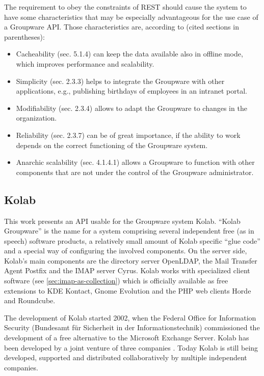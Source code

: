 \documentclass[11pt,a4paper,headsepline,twoside]{scrartcl}		%
\begin{document}
The requirement to obey the constraints of REST should cause the system to have
some characteristics that may be especially advantageous for the use case of a
Groupware API. Those characteristics are, according to \cite{Fielding2000}
(cited sections in parentheses):

\begin{itemize}
\item Cacheability (sec. 5.1.4) can keep the data available also in offline
  mode, which improves performance and scalability.
\item Simplicity (sec. 2.3.3) helps to integrate the Groupware with other
  applications, e.g., publishing birthdays of employees in an intranet portal.
\item Modifiability (sec. 2.3.4) allows to adapt the Groupware to changes in the
  organization.
\item Reliability (sec. 2.3.7) can be of great importance, if the ability to
  work depends on the correct functioning of the Groupware system.
\item Anarchic scalability (sec. 4.1.4.1) allows a Groupware to function with
  other components that are not under the control of the Groupware
  administrator.
\end{itemize}


\subsection{Kolab}
\label{sec:kolab}

This work presents an API usable for the Groupware system Kolab. ``Kolab
Groupware'' is the name for a system comprising several independent free (as in
speech) software products, a relatively small amount of Kolab specific ``glue
code'' and a special way of configuring the involved components. On the server
side, Kolab's main components are the directory server OpenLDAP, the Mail
Transfer Agent Postfix and the IMAP server Cyrus. Kolab works with specialized
client software (see \autoref{sec:imap-as-collection}) which is officially
available as free extensions to KDE Kontact, Gnome Evolution and the PHP web
clients Horde and Roundcube.

The development of Kolab started 2002, when the Federal Office for Information
Security (Bundesamt für Sicherheit in der Informationstechnik) commissioned the
development of a free alternative to the Microsoft Exchange Server. Kolab has
been developed by a joint venture of three companies \cite{Stoermer2004}. Today
Kolab is still being developed, supported and distributed collaboratively by
multiple independent companies.
\end{document}
